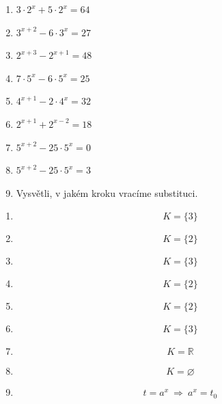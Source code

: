 \documentclass[11pt,a4paper]{article}
\begin{document}
\begin{zadaniReseniBox}[title={Domácí úkol}]
\begin{enumerate}[label=\alph*)]
\item $3\cdot2^x+5\cdot2^x=64$
\item $3^{x+2}-6\cdot3^x=27$
\item $2^{x+3}-2^{x+1}=48$
\item $7\cdot5^x-6\cdot5^x=25$
\item $4^{x+1}-2\cdot4^x=32$
\item $2^{x+1}+2^{x-2}=18$
\item $5^{x+2}-25\cdot5^x=0$
\item $5^{x+2}-25\cdot5^x=3$
\item Vysvětli, v jakém kroku vracíme substituci.
\end{enumerate}
\tcblower
\begin{enumerate}[label=\alph*)]
\item \[
K=\{3\}
\]
\item \[
K=\{2\}
\]
\item \[
K=\{3\}
\]
\item \[
K=\{2\}
\]
\item \[
K=\{2\}
\]
\item \[
K=\{3\}
\]
\item \[
K=\mathbb R
\]
\item \[
K=\varnothing
\]
\item \[
t=a^x\ \Longrightarrow\ a^x=t_0
\]
\end{enumerate}
\end{zadaniReseniBox}
\end{document}
